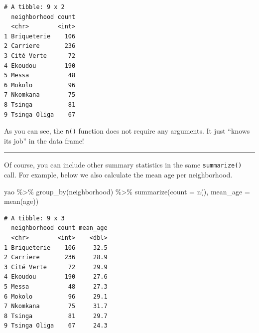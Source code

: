 \documentclass[
  letterpaper,
  DIV=11,
  numbers=noendperiod]{scrreprt}
\newenvironment{Shaded}{\begin{snugshade}}{\end{snugshade}}
\newcommand{\AttributeTok}[1]{\textcolor[rgb]{0.40,0.45,0.13}{#1}}
\newcommand{\FunctionTok}[1]{\textcolor[rgb]{0.28,0.35,0.67}{#1}}
\newcommand{\NormalTok}[1]{\textcolor[rgb]{0.00,0.23,0.31}{#1}}
\newcommand{\SpecialCharTok}[1]{\textcolor[rgb]{0.37,0.37,0.37}{#1}}
\begin{document}
\begin{verbatim}
# A tibble: 9 x 2
  neighborhood count
  <chr>        <int>
1 Briqueterie    106
2 Carriere       236
3 Cité Verte      72
4 Ekoudou        190
5 Messa           48
6 Mokolo          96
7 Nkomkana        75
8 Tsinga          81
9 Tsinga Oliga    67
\end{verbatim}

As you can see, the \texttt{n()} function does not require any
arguments. It just ``knows its job'' in the data frame!

\begin{center}\rule{0.5\linewidth}{0.5pt}\end{center}

Of course, you can include other summary statistics in the same
\texttt{summarize()} call. For example, below we also calculate the mean
age per neighborhood.

\begin{Shaded}
\begin{Highlighting}[]
\NormalTok{yao }\SpecialCharTok{\%\textgreater{}\%} 
  \FunctionTok{group\_by}\NormalTok{(neighborhood) }\SpecialCharTok{\%\textgreater{}\%} 
  \FunctionTok{summarize}\NormalTok{(}\AttributeTok{count =} \FunctionTok{n}\NormalTok{(), }
            \AttributeTok{mean\_age =} \FunctionTok{mean}\NormalTok{(age))}
\end{Highlighting}
\end{Shaded}

\begin{verbatim}
# A tibble: 9 x 3
  neighborhood count mean_age
  <chr>        <int>    <dbl>
1 Briqueterie    106     32.5
2 Carriere       236     28.9
3 Cité Verte      72     29.9
4 Ekoudou        190     27.6
5 Messa           48     27.3
6 Mokolo          96     29.1
7 Nkomkana        75     31.7
8 Tsinga          81     29.7
9 Tsinga Oliga    67     24.3
\end{verbatim}
\end{document}
